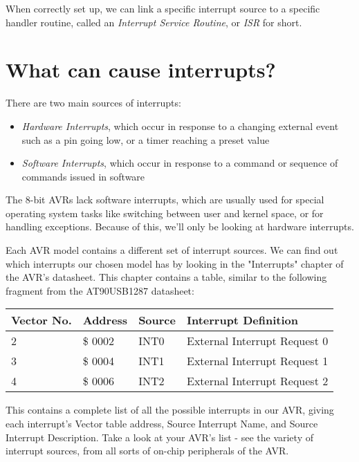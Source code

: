 \documentclass[a4paper,oneside]{book}
\begin{document}
When correctly set up, we can link a specific interrupt source to a specific handler routine, called an \textit{Interrupt Service Routine}, or \textit{ISR} for short.


\label{chp:InterruptCauses}
\chapter{What can cause interrupts?}

There are two main sources of interrupts:

\begin{itemize}
\item \textit{Hardware Interrupts}, which occur in response to a changing external event such as a pin going low, or a timer reaching a preset value
\item \textit{Software Interrupts}, which occur in response to a command or sequence of commands issued in software
\end{itemize}

The 8-bit AVRs lack software interrupts, which are usually used for special operating system tasks like switching between user and kernel space, or for handling exceptions. Because of this, we'll only be looking at hardware interrupts.

Each AVR model contains a different set of interrupt sources. We can find out which interrupts our chosen model has by looking in the "Interrupts" chapter of the AVR's datasheet. This chapter contains a table, similar to the following fragment from the AT90USB1287 datasheet: 

\begin{center}
\begin{tabular}{|l|l|l|l|}
	\hline
	Vector No. & Address & Source & Interrupt Definition \\
	\hline
	2          & \$ 0002   & INT0   & External Interrupt Request 0 \\
	3          & \$ 0004   & INT1   & External Interrupt Request 1 \\
	4          & \$ 0006   & INT2   & External Interrupt Request 2 \\
	\hline
\end{tabular}
\end{center}

This contains a complete list of all the possible interrupts in our AVR, giving each interrupt's Vector table address, Source Interrupt Name, and Source Interrupt Description. Take a look at your AVR's list - see the variety of interrupt sources, from all sorts of on-chip peripherals of the AVR.
\end{document}
